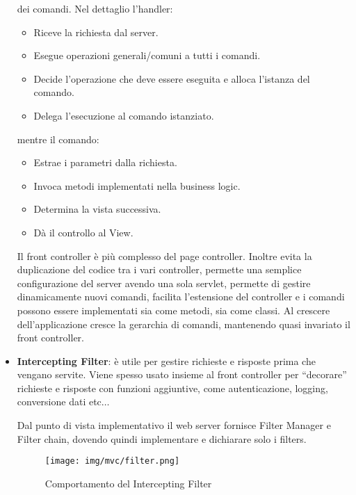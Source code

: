 \begin{itemize}
            dei comandi. Nel dettaglio l'handler:
            \begin{itemize}
                  \item Riceve la richiesta dal server.
                  \item Esegue operazioni generali/comuni a tutti i comandi.
                  \item Decide l'operazione che deve essere eseguita e alloca l'istanza
                        del comando.
                  \item Delega l'esecuzione al comando istanziato.
            \end{itemize}
            mentre il comando:
            \begin{itemize}
                  \item Estrae i parametri dalla richiesta.
                  \item Invoca metodi implementati nella business logic.
                  \item Determina la vista successiva.
                  \item Dà il controllo al View.
            \end{itemize}
            Il front controller è più complesso del page controller. Inoltre evita
            la duplicazione del codice tra i vari controller, permette una semplice
            configurazione del server avendo una sola servlet, permette di gestire
            dinamicamente nuovi comandi, facilita l'estensione del controller e
            i comandi possono essere implementati sia come metodi, sia come classi.
            Al crescere dell'applicazione cresce la gerarchia di comandi, mantenendo
            quasi invariato il front controller.
      \item \textbf{Intercepting Filter}: è utile per gestire richieste e risposte
            prima che vengano servite. Viene spesso usato insieme al front controller per
            “decorare” richieste e risposte con funzioni aggiuntive, come autenticazione,
            logging, conversione dati etc$\dots$

            Dal punto di vista implementativo il web server fornisce Filter Manager
            e Filter chain, dovendo quindi implementare e dichiarare solo i filters.
            \begin{figure}[!ht]
                  \centering
                  \texttt{[image: img/mvc/filter.png]}
                  \caption{Comportamento del Intercepting Filter}
            \end{figure}


\end{itemize}
